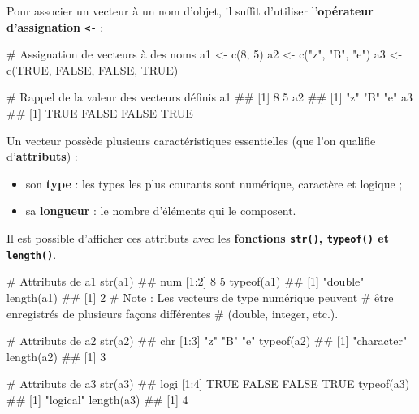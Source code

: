\documentclass[12pt,twosided, notitlepage]{book}
\newenvironment{Shaded}{}{}
\newcommand{\KeywordTok}[1]{\textcolor[rgb]{0.00,0.00,1.00}{{#1}}}
\newcommand{\DecValTok}[1]{{#1}}
\newcommand{\StringTok}[1]{\textcolor[rgb]{0.00,0.50,0.50}{{#1}}}
\newcommand{\CommentTok}[1]{\textcolor[rgb]{0.00,0.50,0.00}{{#1}}}
\newcommand{\OtherTok}[1]{\textcolor[rgb]{1.00,0.25,0.00}{{#1}}}
\newcommand{\NormalTok}[1]{{#1}}
\providecommand{\tightlist}{%
  \setlength{\itemsep}{0pt}\setlength{\parskip}{0pt}}
\renewenvironment{Shaded}{\begin{snugshade}}{\end{snugshade}}
\begin{document}
Pour associer un vecteur à un nom d'objet, il suffit d'utiliser
l'\textbf{opérateur d'assignation
\texttt{\textless{}-}}\index{\texttt{<-}} :

\begin{Shaded}
\begin{Highlighting}[]
\CommentTok{# Assignation de vecteurs à des noms}
\NormalTok{a1 <-}\StringTok{ }\KeywordTok{c}\NormalTok{(}\DecValTok{8}\NormalTok{, }\DecValTok{5}\NormalTok{)}
\NormalTok{a2 <-}\StringTok{ }\KeywordTok{c}\NormalTok{(}\StringTok{"z"}\NormalTok{, }\StringTok{"B"}\NormalTok{, }\StringTok{"e"}\NormalTok{)}
\NormalTok{a3 <-}\StringTok{ }\KeywordTok{c}\NormalTok{(}\OtherTok{TRUE}\NormalTok{, }\OtherTok{FALSE}\NormalTok{, }\OtherTok{FALSE}\NormalTok{, }\OtherTok{TRUE}\NormalTok{)}

\CommentTok{# Rappel de la valeur des vecteurs définis}
\NormalTok{a1}
  \NormalTok{## [1] 8 5}
\NormalTok{a2}
  \NormalTok{## [1] "z" "B" "e"}
\NormalTok{a3}
  \NormalTok{## [1]  TRUE FALSE FALSE  TRUE}
\end{Highlighting}
\end{Shaded}

Un vecteur possède plusieurs caractéristiques essentielles (que l'on
qualifie d'\textbf{attributs}) :

\begin{itemize}
\tightlist
\item
  son \textbf{type} : les types les plus courants sont numérique,
  caractère et logique ;
\item
  sa \textbf{longueur} : le nombre d'éléments qui le composent.
\end{itemize}

Il est possible d'afficher ces attributs avec les \textbf{fonctions
\texttt{str()}, \texttt{typeof()} et
\texttt{length()}}.

\begin{Shaded}
\begin{Highlighting}[]
\CommentTok{# Attributs de a1}
\KeywordTok{str}\NormalTok{(a1)}
  \NormalTok{##  num [1:2] 8 5}
\KeywordTok{typeof}\NormalTok{(a1)}
  \NormalTok{## [1] "double"}
\KeywordTok{length}\NormalTok{(a1)}
  \NormalTok{## [1] 2}
\CommentTok{# Note : Les vecteurs de type numérique peuvent }
\CommentTok{# être enregistrés de plusieurs façons différentes}
\CommentTok{# (double, integer, etc.).}

\CommentTok{# Attributs de a2}
\KeywordTok{str}\NormalTok{(a2)}
  \NormalTok{##  chr [1:3] "z" "B" "e"}
\KeywordTok{typeof}\NormalTok{(a2)}
  \NormalTok{## [1] "character"}
\KeywordTok{length}\NormalTok{(a2)}
  \NormalTok{## [1] 3}

\CommentTok{# Attributs de a3}
\KeywordTok{str}\NormalTok{(a3)}
  \NormalTok{##  logi [1:4] TRUE FALSE FALSE TRUE}
\KeywordTok{typeof}\NormalTok{(a3)}
  \NormalTok{## [1] "logical"}
\KeywordTok{length}\NormalTok{(a3)}
  \NormalTok{## [1] 4}
\end{Highlighting}
\end{Shaded}
\end{document}
